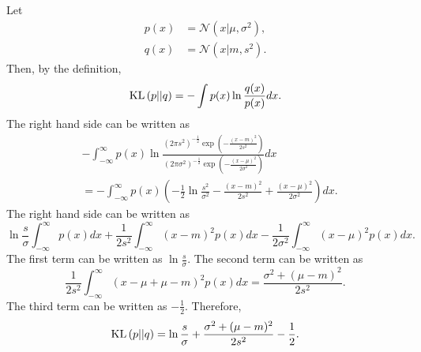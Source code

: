 \subsection{}
\label{1.30}
Let 
%
\begin{equation}
\begin{aligned}
p(x) &= \mathcal{N} \left( x | \mu, \sigma ^2 \right), \\
q(x) &= \mathcal{N} \left( x | m, s ^2 \right).
\end{aligned}
\end{equation}
%
Then, by the definition,
%
\begin{equation}
{\rm KL} \left( p || q \right) = - \int p(x) \ln \frac{q(x)}{p(x)} dx.
\end{equation}
%
The right hand side can be written as 
%
\begin{equation}
\begin{aligned}
&- \int_{- \infty}^{\infty} p(x) \ln \frac{\left( 2 \pi s ^ 2 \right) ^ {- \frac{1}{2}} \exp \left( - \frac{(x - m) ^ 2}{2 s ^ 2} \right)}{\left( 2 \pi \sigma ^ 2 \right) ^ {- \frac{1}{2}} \exp \left( - \frac{(x - \mu) ^ 2}{2 \sigma ^ 2} \right)} dx \\
& = - \int_{- \infty}^{\infty} p(x) \left( -\frac{1}{2} \ln \frac{s ^ 2}{\sigma ^ 2} - \frac{(x - m) ^ 2}{2 s ^ 2} + \frac{(x - \mu) ^ 2}{2 \sigma ^ 2} \right) dx.
\end{aligned}
\end{equation}
%
The right hand side can be written as
%
\begin{equation}
\ln \frac{s}{\sigma} \int_{- \infty}^{\infty} p(x) dx + \frac{1}{2 s ^2} \int_{- \infty}^{\infty} (x - m) ^ 2 p(x) dx - \frac{1}{2 \sigma ^2} \int_{- \infty}^{\infty} (x - \mu) ^ 2 p(x) dx.
\end{equation}
%
The first term can be written as $\ln \frac{s}{\sigma}$.
The second term can be written as
%
\begin{equation}
\frac{1}{2 s ^2} \int_{- \infty}^{\infty} (x - \mu + \mu - m) ^ 2 p(x) dx = \frac{\sigma ^ 2 + (\mu - m) ^ 2}{2 s ^ 2}.
\end{equation}
%
The third term can be written as $- \frac{1}{2}$.
Therefore,
%
\begin{equation}
{\rm KL} \left( p || q \right) = \ln \frac{s}{\sigma} + \frac{\sigma ^ 2 + (\mu - m) ^ 2}{2 s ^ 2} - \frac{1}{2}. 
\end{equation}
%


